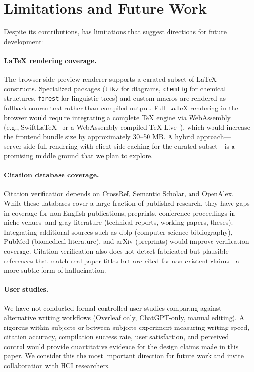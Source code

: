 \section{Limitations and Future Work}
\label{sec:limitations}

Despite its contributions, \software{} has limitations that suggest
directions for future development:

\paragraph{\LaTeX{} rendering coverage.} The browser-side preview renderer
supports a curated subset of \LaTeX{} constructs. Specialized packages
(\texttt{tikz} for diagrams, \texttt{chemfig} for chemical structures,
\texttt{forest} for linguistic trees) and custom macros are rendered as
fallback source text rather than compiled output. Full \LaTeX{} rendering in
the browser would require integrating a complete \TeX{} engine via
WebAssembly~\cite{webassembly2017} (e.g., SwiftLaTeX~\cite{swiftlatex} or a
WebAssembly-compiled TeX Live~\cite{texlive}), which
would increase the frontend bundle size by approximately 30--50 MB. A hybrid
approach---server-side full rendering with client-side caching for the
curated subset---is a promising middle ground that we plan to explore.

\paragraph{Citation database coverage.} Citation verification depends on
CrossRef, Semantic Scholar, and OpenAlex. While these databases cover a large
fraction of published research, they have gaps in coverage for non-English
publications, preprints, conference proceedings in niche venues, and gray
literature (technical reports, working papers, theses). Integrating additional
sources such as dblp (computer science bibliography), PubMed (biomedical
literature), and arXiv (preprints) would improve verification coverage.
Citation verification also does not detect fabricated-but-plausible references
that match real paper titles but are cited for non-existent claims---a more
subtle form of hallucination.

\paragraph{User studies.} We have not conducted formal controlled user studies
comparing \software{} against alternative writing workflows (Overleaf only,
ChatGPT-only, manual editing). A rigorous within-subjects or between-subjects
experiment measuring writing speed, citation accuracy, compilation success
rate, user satisfaction, and perceived control would provide quantitative
evidence for the design claims made in this paper. We consider this the most
important direction for future work and invite collaboration with HCI
researchers.

